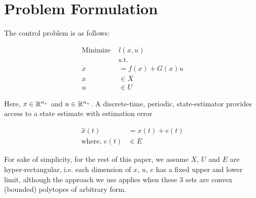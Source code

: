 \section{Problem Formulation} \label{sec:formulation}

The control problem is as follows:

\begin{subequations}
\label{eq:CtrlPrb}
\begin{align}
\text{Minimize } &l(x,u) \\
&\text{s.t.} \nonumber \\
\dot{x}&=f(x)+G(x)u \label{eq:NL_Plant} \\
x&\in X\\
u&\in U
\end{align}
\end{subequations}

Here, $x \in \mathbb{R}^{n_x}$ and $u \in \mathbb{R}^{n_u}$. A discrete-time, periodic, state-estimator provides access to a state estimate with estimation error

\begin{subequations}
\label{eq:NL_estimate}
\begin{align}
\hat{x}(t)&=x(t)+e(t) \\ 
\text{where, } e(t) &\in E
\end{align}
\end{subequations}

For sake of simplicity, for the rest of this paper, we assume $X$, $U$ and $E$ are hyper-rectangular, i.e. each dimension of $x$, $u$, $e$ has a fixed upper and lower limit, although the approach we use applies when these 3 sets are convex (bounded) polytopes of arbitrary form.
